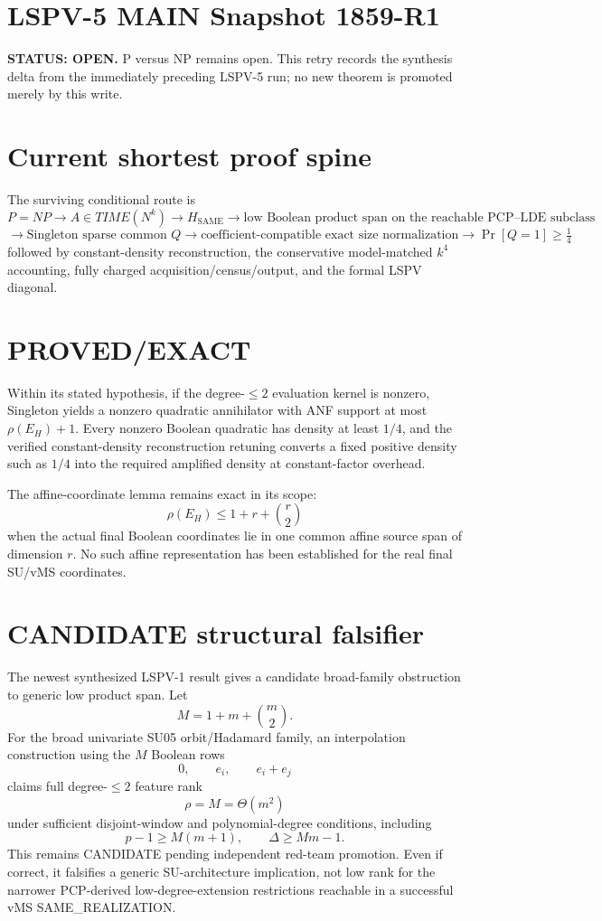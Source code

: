 \documentclass[11pt]{article}
\begin{document}
\section*{LSPV-5 MAIN Snapshot 1859-R1}
\textbf{STATUS: OPEN.} P versus NP remains open. This retry records the synthesis delta from the immediately preceding LSPV-5 run; no new theorem is promoted merely by this write.

\section*{Current shortest proof spine}
The surviving conditional route is
\[
P=NP \to A\in TIME(N^k) \to H_{\mathrm{SAME}}
\to \boxed{\text{low Boolean product span on the reachable PCP--LDE subclass}}
\]
\[
\to \text{Singleton sparse common }Q
\to \boxed{\text{coefficient-compatible exact size normalization}}
\to \Pr[Q=1]\ge \tfrac14
\]
followed by constant-density reconstruction, the conservative model-matched $k^4$ accounting, fully charged acquisition/census/output, and the formal LSPV diagonal.

\section*{PROVED/EXACT}
Within its stated hypothesis, if the degree-$\le2$ evaluation kernel is nonzero, Singleton yields a nonzero quadratic annihilator with ANF support at most $\rho(E_H)+1$. Every nonzero Boolean quadratic has density at least $1/4$, and the verified constant-density reconstruction retuning converts a fixed positive density such as $1/4$ into the required amplified density at constant-factor overhead.

The affine-coordinate lemma remains exact in its scope:
\[
\rho(E_H)\le 1+r+\binom r2
\]
when the actual final Boolean coordinates lie in one common affine source span of dimension $r$. No such affine representation has been established for the real final SU/vMS coordinates.

\section*{CANDIDATE structural falsifier}
The newest synthesized LSPV-1 result gives a candidate broad-family obstruction to generic low product span. Let
\[
M=1+m+\binom m2.
\]
For the broad univariate SU05 orbit/Hadamard family, an interpolation construction using the $M$ Boolean rows
\[
0,\qquad e_i,\qquad e_i+e_j
\]
claims full degree-$\le2$ feature rank
\[
\rho=M=\Theta(m^2)
\]
under sufficient disjoint-window and polynomial-degree conditions, including
\[
p-1\ge M(m+1),\qquad \Delta\ge Mm-1.
\]
This remains CANDIDATE pending independent red-team promotion. Even if correct, it falsifies a generic SU-architecture implication, not low rank for the narrower PCP-derived low-degree-extension restrictions reachable in a successful vMS SAME_REALIZATION.
\end{document}
